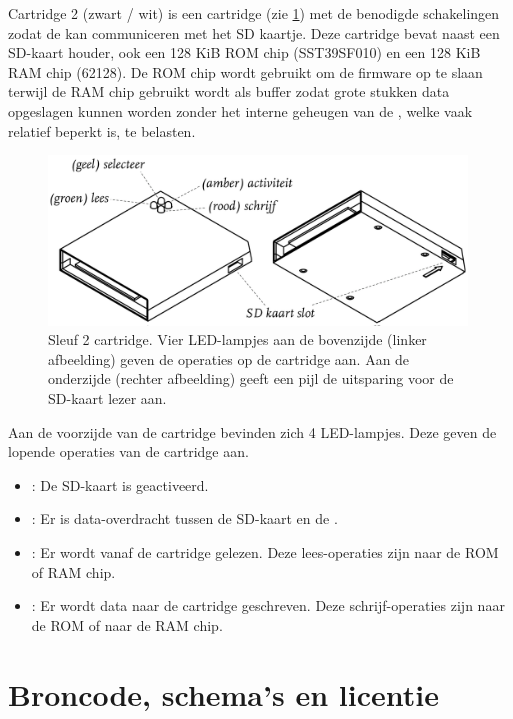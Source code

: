 
Cartridge 2 (zwart / wit) is een  cartridge (zie \cref{fig:cartridge-sleuf2}) met de benodigde schakelingen zodat de  kan communiceren met het SD kaartje. Deze cartridge bevat naast een SD-kaart houder, ook een 128 KiB ROM chip (SST39SF010) en een 128 KiB RAM chip (62128). De ROM chip wordt gebruikt om de firmware op te slaan terwijl de RAM chip gebruikt wordt als buffer zodat grote stukken data opgeslagen kunnen worden zonder het interne geheugen van de , welke vaak relatief beperkt is, te belasten.

\begin{figure}[h!]
    \centering
    \includegraphics[width=0.99\textwidth]{img/sd-card-cartridge.png}
    \caption{Sleuf 2 cartridge. Vier LED-lampjes aan de bovenzijde (linker afbeelding) geven de operaties op de cartridge aan. Aan de onderzijde (rechter afbeelding) geeft een pijl de uitsparing voor de SD-kaart lezer aan.}
    \label{fig:cartridge-sleuf2}
\end{figure}

Aan de voorzijde van de cartridge bevinden zich 4 LED-lampjes. Deze geven de lopende operaties van de cartridge aan.

\begin{itemize}[noitemsep]
    \item {}: De SD-kaart is geactiveerd.
    \item {}: Er is data-overdracht tussen de SD-kaart en de .
    \item {}: Er wordt vanaf de cartridge gelezen. Deze lees-operaties zijn naar de ROM of RAM chip.
    \item {}: Er wordt data naar de cartridge geschreven. Deze schrijf-operaties zijn naar de ROM of naar de RAM chip.
\end{itemize}

%
%
%
\section{Broncode, schema's en licentie}


